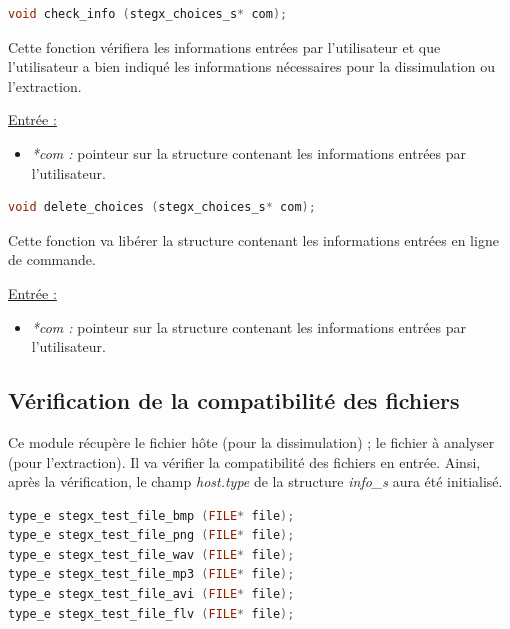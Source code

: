 \documentclass[11pt]{article}
\begin{document}
\begin{lstlisting}[language=c]
void check_info (stegx_choices_s* com);
\end{lstlisting}

Cette fonction vérifiera les informations entrées par l'utilisateur et 
que l'utilisateur a bien indiqué les informations nécessaires pour 
la dissimulation ou l'extraction. \newline

\underline{Entrée :} 
\begin{itemize}
\item \textit{*com :} pointeur sur la structure contenant les informations 
entrées par l'utilisateur. 
\newline 
\end{itemize}

\begin{lstlisting}[language=c]
void delete_choices (stegx_choices_s* com);
\end{lstlisting}

Cette fonction va libérer la structure contenant les informations entrées 
en ligne de commande. \newline

\underline{Entrée :} 
\begin{itemize}
\item \textit{*com :} pointeur sur la structure contenant les informations 
entrées par l'utilisateur. 
\newline 
\end{itemize}

\subsection{Vérification de la compatibilité des fichiers}

Ce module récupère le fichier hôte (pour la dissimulation) ; 
le fichier à analyser (pour l'extraction). Il va  vérifier la compatibilité des 
fichiers en entrée. 
Ainsi, après la vérification, le champ \textit{host.type} de la structure 
\textit{info\_s} aura été initialisé.  
\newline

\begin{lstlisting}[language=c]
type_e stegx_test_file_bmp (FILE* file);
type_e stegx_test_file_png (FILE* file);
type_e stegx_test_file_wav (FILE* file);
type_e stegx_test_file_mp3 (FILE* file);
type_e stegx_test_file_avi (FILE* file);
type_e stegx_test_file_flv (FILE* file);
\end{lstlisting}
\end{document}
